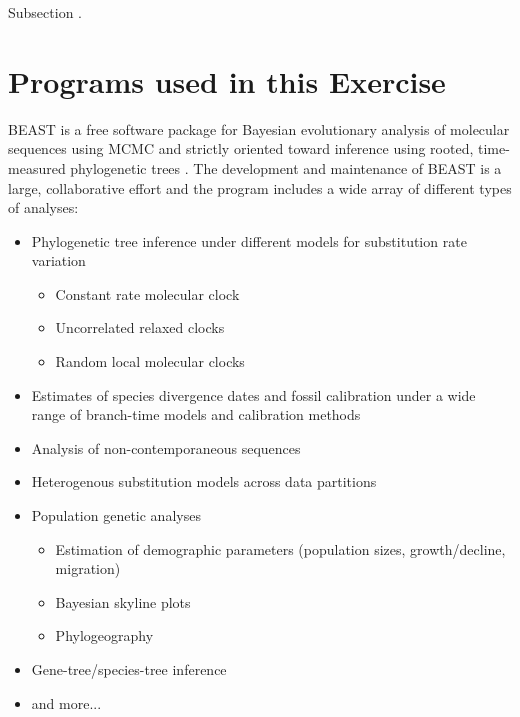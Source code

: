 \documentclass[11pt]{article}
\begin{document}
Subsection \citep{zuckerkandl62}. 


\clearpage
\newpage
\section{Programs used in this Exercise}\label{programsSec}


BEAST is a free software package for Bayesian evolutionary analysis of molecular sequences using MCMC and strictly oriented toward inference using rooted, time-measured phylogenetic trees \citep{drummond06,drummond07,Bouckaert2014}. The development and maintenance of BEAST is a large, collaborative effort and the program includes a wide array of different types of analyses:

\vspace{-4mm}
\begin{itemize}
\item Phylogenetic tree inference under different models for substitution rate variation \vspace{-3mm}
\begin{itemize}
\item Constant rate molecular clock \citep{zuckerkandl62} \vspace{-2mm}
\item Uncorrelated relaxed clocks \citep{drummond06} \vspace{-2mm}
\item Random local molecular clocks \citep{drummond10} \vspace{-2mm}
\end{itemize}
\item Estimates of species divergence dates and fossil calibration under a wide range of branch-time models and calibration methods \vspace{-3mm}
\item Analysis of non-contemporaneous sequences \vspace{-3mm}
\item Heterogenous substitution models across data partitions \vspace{-3mm}
\item Population genetic analyses\vspace{-3mm}
\begin{itemize}
\item Estimation of demographic parameters (population sizes, growth/decline, migration) \vspace{-2mm}
\item Bayesian skyline plots \vspace{-2mm}
\item Phylogeography \citep{lemey09} \vspace{-2mm}
\end{itemize}
\item Gene-tree/species-tree inference \citep[$*$BEAST;][]{heled10} \vspace{-3mm}
\item and more...\vspace{-3mm}
\end{itemize}
\end{document}
